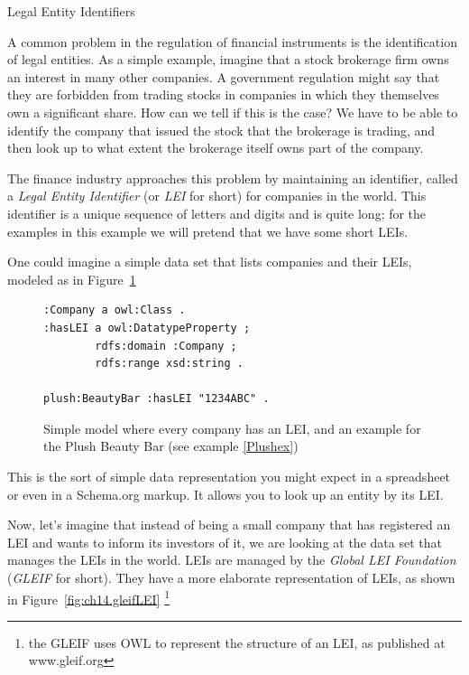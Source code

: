 \begin{challenge}{Legal Entity Identifiers}

A common problem in the regulation of financial instruments 
is the identification of legal entities.  As a simple example, 
imagine that a stock brokerage firm owns an interest in many other 
companies.  A government regulation might say that they are 
forbidden from trading 
stocks in companies in which  they themselves own a significant share.  
How can we tell if this is the case?  We have to be able to 
identify the company that issued the stock that the brokerage 
is trading, and then look up to what extent the brokerage itself
owns part of the company. 

\solution

The finance industry approaches this problem by maintaining an 
identifier, called a \emph{Legal Entity Identifier} (or \emph{LEI} for short)
for companies in the world.  This identifier is a unique sequence of 
letters and digits and is quite long; for the examples in this 
example we will pretend that we have some short LEIs. 

One could imagine a simple data set that lists companies and 
their LEIs, modeled as in Figure~\ref{fig:ch14.simpleLEI}

\begin{figure}
\begin{lstlisting}
:Company a owl:Class .
:hasLEI a owl:DatatypeProperty ;
        rdfs:domain :Company ;
        rdfs:range xsd:string .

plush:BeautyBar :hasLEI "1234ABC" .        
\end{lstlisting}
    \caption{Simple model where every company has an LEI, and an example for the Plush Beauty Bar (see example \ref{Plushex})}
    \label{fig:ch14.simpleLEI}
\end{figure}


This is the sort of simple data representation you might expect 
in a spreadsheet or even in a Schema.org markup.  It allows you 
to look up an entity by its LEI. 

Now, let's imagine that instead of being a small company that  has 
registered an LEI and wants to inform its investors 
of it, we are looking at the data set that manages the LEIs in the 
world.  LEIs are managed by the 
\emph{Global LEI Foundation} (\emph{GLEIF} for short).  
They have a more elaborate representation of LEIs, as shown in 
Figure~\ref{fig:ch14.gleifLEI} \footnote{the GLEIF uses OWL to represent the structure of an LEI, as published at www.gleif.org}


\end{challenge}
